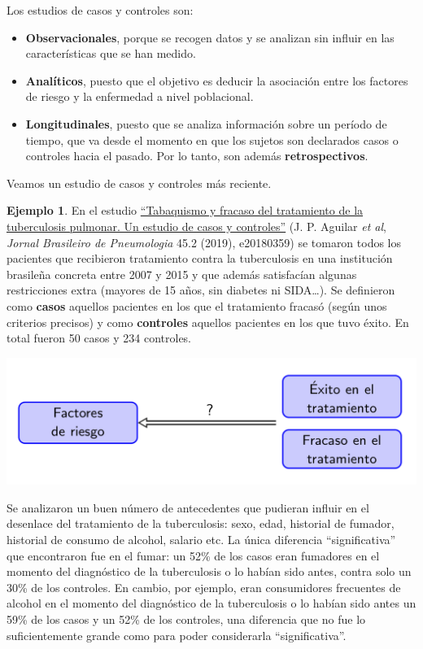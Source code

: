 \documentclass[
]{book}
\theoremstyle{definition}
\theoremstyle{definition}
\newtheorem{example}{Ejemplo}[chapter]
\theoremstyle{definition}
\theoremstyle{definition}
\theoremstyle{remark}
\begin{document}
Los estudios de casos y controles son:

\begin{itemize}
\item
  \textbf{Observacionales}, porque se recogen datos y se analizan sin influir en las características que se han medido.
\item
  \textbf{Analíticos}, puesto que el objetivo es deducir la asociación entre los factores de riesgo y la enfermedad a nivel poblacional.
\item
  \textbf{Longitudinales}, puesto que se analiza información sobre un período de tiempo, que va desde el momento en que los sujetos son declarados casos o controles hacia el pasado. Por lo tanto, son además \textbf{retrospectivos}.
\end{itemize}

Veamos un estudio de casos y controles más reciente.

\begin{example}
\protect\hypertarget{exm:tuberculosisCC}{}\label{exm:tuberculosisCC}En el estudio \href{https://www.scielo.br/scielo.php?pid=S1806-37132019000200205\&script=sci_arttext\&tlng=es}{``Tabaquismo y fracaso del tratamiento de la tuberculosis pulmonar. Un estudio de casos y controles''} (J. P. Aguilar \emph{et al}, \emph{Jornal Brasileiro de Pneumologia} 45.2 (2019), e20180359) se tomaron todos los pacientes que recibieron tratamiento contra la tuberculosis en una institución brasileña concreta entre 2007 y 2015 y que además satisfacían algunas restricciones extra (mayores de 15 años, sin diabetes ni SIDA\ldots). Se definieron como \textbf{casos} aquellos pacientes en los que el tratamiento fracasó (según unos criterios precisos) y como \textbf{controles} aquellos pacientes en los que tuvo éxito. En total fueron 50 casos y 234 controles.
\end{example}

\begin{center}\includegraphics[width=0.8\linewidth]{INREMDN_files/figure-html/TB} \end{center}

Se analizaron un buen número de antecedentes que pudieran influir en el desenlace del tratamiento de la tuberculosis: sexo, edad, historial de fumador, historial de consumo de alcohol, salario etc. La única diferencia ``significativa'' que encontraron fue en el fumar: un 52\% de los casos eran fumadores en el momento del diagnóstico de la tuberculosis o lo habían sido antes, contra solo un 30\% de los controles. En cambio, por ejemplo, eran consumidores frecuentes de alcohol en el momento del diagnóstico de la tuberculosis o lo habían sido antes un 59\% de los casos y un 52\% de los controles, una diferencia que no fue lo suficientemente grande como para poder considerarla ``significativa''.
\end{document}
